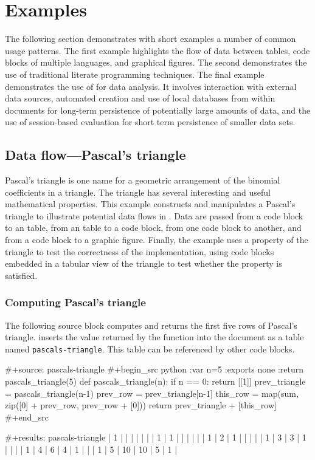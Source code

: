 \documentclass[article,shortnames]{jss}
\begin{document}
\section{Examples}
\label{sec-4}
\label{examples}


The following section demonstrates with short examples a number of
common  usage patterns.  The first example highlights the flow
of data between tables, code blocks of multiple languages, and
graphical figures.  The second demonstrates the use of traditional
literate programming techniques.  The final example demonstrates the
use of  for data analysis. It involves interaction with
external data sources, automated creation and use of local databases
from within  documents for long-term persistence of
potentially large amounts of data, and the use of session-based
evaluation for short term persistence of smaller data sets.
\subsection{Data flow---Pascal's triangle}
\label{sec-4-1}
\label{pascals-triangle}


Pascal's triangle is one name for a geometric arrangement of the
binomial coefficients in a triangle.  The triangle has several
interesting and useful mathematical properties.  This example
constructs and manipulates a Pascal's triangle to illustrate potential
data flows in .  Data are passed from a code block to an
 table, from an  table to a code block, from one code
block to another, and from a code block to a graphic figure.  Finally,
the example uses a property of the triangle to test the correctness of
the implementation, using  code blocks embedded in a tabular
view of the triangle to test whether the property is satisfied.
\subsubsection{Computing Pascal's triangle}
\label{sec-4-1-1}

The following  source block computes and returns the first
five rows of Pascal's triangle.   inserts the value returned
by the  function into the  document as a table named
\texttt{pascals-triangle}.  This table can be referenced by other code
blocks.

\begin{Code}
#+source: pascals-triangle
#+begin_src python :var n=5 :exports none :return pascals_triangle(5)
  def pascals_triangle(n):
      if n == 0:
          return [[1]]
      prev_triangle = pascals_triangle(n-1)
      prev_row = prev_triangle[n-1]
      this_row = map(sum, zip([0] + prev_row, prev_row + [0]))
      return prev_triangle + [this_row]
#+end_src

#+results: pascals-triangle
| 1 |   |    |    |   |   |
| 1 | 1 |    |    |   |   |
| 1 | 2 |  1 |    |   |   |
| 1 | 3 |  3 |  1 |   |   |
| 1 | 4 |  6 |  4 | 1 |   |
| 1 | 5 | 10 | 10 | 5 | 1 |
\end{Code}
\end{document}
